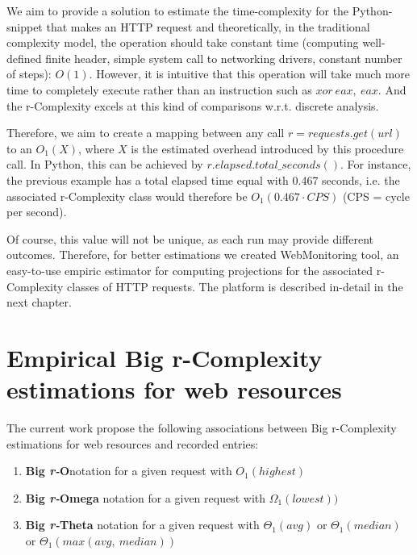 We aim to provide a solution to estimate the time-complexity for the Python-snippet that makes an HTTP request and theoretically, in the traditional complexity model, the operation should take constant time (computing well-defined finite header, simple system call to networking drivers, constant number of steps): $O(1)$. However, it is intuitive that this operation will take much more time to completely execute rather than an instruction such as $xor\ eax,\ eax$. And the r-Complexity excels at this kind of comparisons w.r.t. discrete analysis.

Therefore, we aim to create a mapping between any call $r = requests.get(url)$ to an $O_{1}(X)$, where $X$ is the estimated overhead introduced by this procedure call. In Python, this can be achieved by $r.elapsed.total\_seconds()$. For instance, the previous example has a total elapsed time equal with 0.467 seconds, i.e. the associated r-Complexity class would therefore be $O_{1}(0.467 \cdot CPS)$ (CPS = cycle per second). 

Of course, this value will not be unique, as each run may provide different outcomes. Therefore, for better estimations we created WebMonitoring tool, an easy-to-use empiric estimator for computing projections for the associated r-Complexity classes of HTTP requests. The platform is described in-detail in the next chapter.


\section{Empirical Big r-Complexity estimations for web resources}


The current work propose the following associations between Big r-Complexity estimations for web resources and recorded entries: 

\begin{enumerate}
\item \textbf{Big \textit{r-}O}notation for a given request with $O_{1}(highest)$
\item \textbf{Big \textit{r-}Omega} notation for a given request with $\Omega_{1}(lowest))$
\item \textbf{Big \textit{r-}Theta} notation for a given request with $\Theta_{1}(avg)$ or $\Theta_{1}(median)$ or $\Theta_{1}(max(avg,\ median))$
\end{enumerate}


